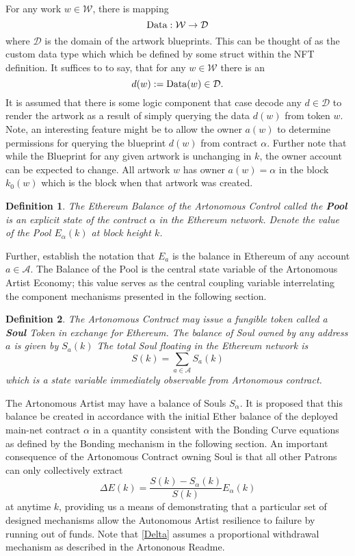 \documentclass[11pt]{amsart}
\newtheorem{definition}{Definition}
\begin{document}
For any work $w\in \mathcal{W}$, there is mapping 
\begin{equation}
\hbox{Data}: \mathcal{W} \rightarrow \mathcal{D}
\end{equation}
where $\mathcal{D}$ is the domain of the artwork blueprints. This can be thought of as the custom data type which which be defined by some struct within the NFT definition.  It suffices to to say, that for any $w\in \mathcal{W}$ there is an
\begin{equation}
d(w) := \hbox{Data}(w) \in  \mathcal{D}.
\end{equation}
It is assumed that there is some logic component that case decode any $d\in\mathcal{D}$ to render the artwork as a result of simply querying the data $d(w)$ from token $w$. Note, an interesting feature might be to allow the owner $a(w)$ to determine permissions for querying the blueprint $d(w)$ from contract $\alpha$. Further note that while the Blueprint for any given artwork is unchanging in $k$, the owner account can be expected to change. All artwork $w$ has owner $a(w)=\alpha$ in the block $k_0(w)$ which is the block when that artwork was created.

\begin{definition}
The Ethereum Balance of the Artonomous Control called the \textbf{Pool} is an explicit state of the contract $\alpha$ in the Ethereum network. Denote the value of the Pool $E_\alpha(k)$ at block height $k$. \end{definition}

Further, establish the notation that $E_a$ is the balance in Ethereum of any account $a\in \mathcal{A}$. The Balance of the Pool is the central state variable of the Artonomous Artist Economy; this value serves as the central coupling variable interrelating the component mechanisms presented in the following section.

\begin{definition}
The Artonomous Contract may issue a fungible token called a \textbf{Soul} Token in exchange for Ethereum.  The balance of Soul owned by any address $a$ is given by $S_a(k)$ The total Soul floating in the Ethereum network is
\[ 
S(k) = \sum_{a\in\mathcal{A}} S_a(k)
\]
which is a state variable immediately observable from Artonomous contract.
\end{definition}

The Artonomous Artist may have a balance of Souls $S_\alpha$. It is proposed that this balance be created in accordance with the initial Ether balance of the deployed main-net contract $\alpha$ in a quantity consistent with the Bonding Curve equations as defined by the Bonding mechanism in the following section. An important consequence of the Artonomous Contract owning Soul is that all other Patrons can only collectively extract 
\begin{equation}
\Delta E(k) = \frac{S(k) - S_\alpha(k)}{S(k)} E_\alpha(k) \label{Delta}
\end{equation}
at anytime $k$, providing us a means of demonstrating that a particular set of designed mechanisms allow the Autonomous Artist resilience to failure by running out of funds. Note that \eqref{Delta} assumes a proportional withdrawal mechanism as described in the Artononous Readme.
\end{document}
